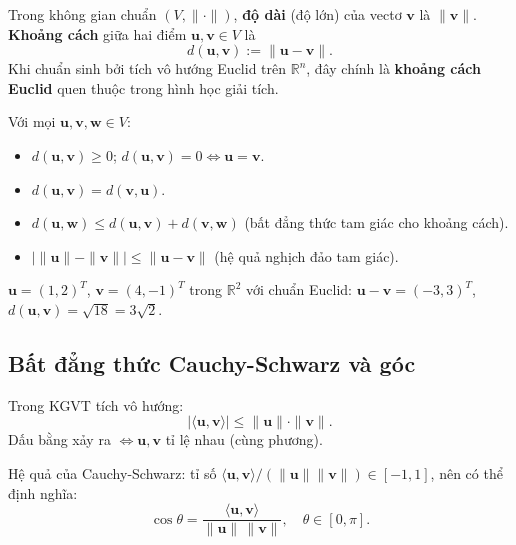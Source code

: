 \documentclass[12pt,a4paper]{article}
\begin{document}
\begin{dinhnghia}
Trong không gian chuẩn $(V, \|\cdot\|)$, \textbf{độ dài} (độ lớn) của vectơ $\mathbf{v}$ là $\|\mathbf{v}\|$. \textbf{Khoảng cách} giữa hai điểm $\mathbf{u}, \mathbf{v} \in V$ là
\[
  d(\mathbf{u}, \mathbf{v}) := \|\mathbf{u} - \mathbf{v}\|.
\]
Khi chuẩn sinh bởi tích vô hướng Euclid trên $\mathbb{R}^n$, đây chính là \textbf{khoảng cách Euclid} quen thuộc trong hình học giải tích.
\end{dinhnghia}

\begin{tinhchat}[title={Metric sinh bởi chuẩn}]
Với mọi $\mathbf{u}, \mathbf{v}, \mathbf{w} \in V$:
\begin{itemize}
  \item $d(\mathbf{u}, \mathbf{v}) \ge 0$; $d(\mathbf{u}, \mathbf{v}) = 0 \Leftrightarrow \mathbf{u} = \mathbf{v}$.
  \item $d(\mathbf{u}, \mathbf{v}) = d(\mathbf{v}, \mathbf{u})$.
  \item $d(\mathbf{u}, \mathbf{w}) \le d(\mathbf{u}, \mathbf{v}) + d(\mathbf{v}, \mathbf{w})$ (bất đẳng thức tam giác cho khoảng cách).
  \item $\bigl|\|\mathbf{u}\| - \|\mathbf{v}\|\bigr| \le \|\mathbf{u} - \mathbf{v}\|$ (hệ quả nghịch đảo tam giác).
\end{itemize}
\end{tinhchat}

\begin{vidu}
$\mathbf{u} = (1, 2)^T$, $\mathbf{v} = (4, -1)^T$ trong $\mathbb{R}^2$ với chuẩn Euclid: $\mathbf{u} - \mathbf{v} = (-3, 3)^T$, $d(\mathbf{u}, \mathbf{v}) = \sqrt{18} = 3\sqrt{2}$.
\end{vidu}

\subsection{Bất đẳng thức Cauchy-Schwarz và góc}

\begin{dinhly}[title={Bất đẳng thức Cauchy-Schwarz}]
Trong KGVT tích vô hướng:
\[
  |\langle \mathbf{u}, \mathbf{v}\rangle| \le \|\mathbf{u}\| \cdot \|\mathbf{v}\|.
\]
Dấu bằng xảy ra $\Leftrightarrow \mathbf{u}, \mathbf{v}$ tỉ lệ nhau (cùng phương).
\end{dinhly}

\begin{congthuc}[title={Góc giữa hai vectơ}]
Hệ quả của Cauchy-Schwarz: tỉ số $\langle \mathbf{u}, \mathbf{v}\rangle / (\|\mathbf{u}\|\|\mathbf{v}\|) \in [-1, 1]$, nên có thể định nghĩa:
\[
  \cos\theta = \dfrac{\langle \mathbf{u}, \mathbf{v}\rangle}{\|\mathbf{u}\|\,\|\mathbf{v}\|},\quad \theta \in [0, \pi].
\]
\end{congthuc}
\end{document}
